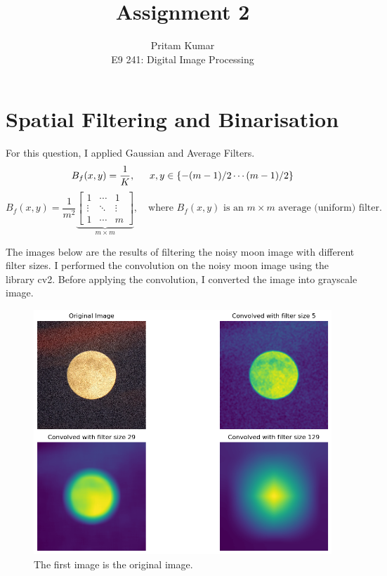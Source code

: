 \documentclass[12pt]{article}
\begin{document}
 
 
\title{Assignment 2}
\author{Pritam Kumar\\ %
E9 241: Digital Image Processing}

\maketitle

\section{Spatial Filtering and Binarisation}
For this question, I applied Gaussian and Average Filters. 
\[
B_f(x,y) = \frac{1}{K}, \hspace{15 pt} x,y \in \{-(m-1)/2 \cdots (m-1)/2\}
\]
\[
B_f(x,y) = \frac{1}{m^2}
\underbrace{\begin{bmatrix}
1 & \cdots & 1 \\
\vdots & \ddots & \vdots \\
1 & \cdots & m
\end{bmatrix}}_{m \times m},
\quad \text{where $B_f(x,y)$ is an $m \times m$ average (uniform) filter.}
\]

The images below are the results of filtering the noisy moon image with different filter sizes. I performed the convolution on the noisy moon image using the library cv2. Before applying the convolution, I converted the image into grayscale image.
\begin{figure}[t]
    \centering
    \includegraphics[width=1\linewidth]{convolved.png}
    \caption{The first image is the original image. }
    \label{conv}
\end{figure}
\end{document}
